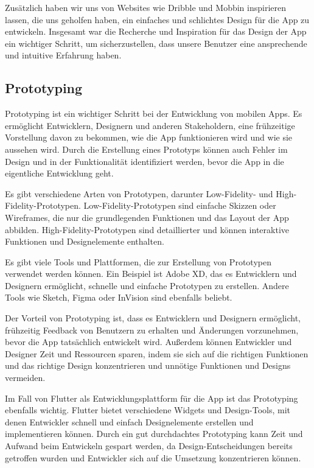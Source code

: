 Zusätzlich haben wir uns von Websites wie Dribble und Mobbin inspirieren lassen, die uns geholfen haben, ein einfaches und schlichtes Design für die App zu entwickeln. Insgesamt war die Recherche und Inspiration für das Design der App ein wichtiger Schritt, um sicherzustellen, dass unsere Benutzer eine ansprechende und intuitive Erfahrung haben.

\subsection{Prototyping}
Prototyping ist ein wichtiger Schritt bei der Entwicklung von mobilen Apps. Es ermöglicht Entwicklern, Designern und anderen Stakeholdern, eine frühzeitige Vorstellung davon zu bekommen, wie die App funktionieren wird und wie sie aussehen wird. Durch die Erstellung eines Prototyps können auch Fehler im Design und in der Funktionalität identifiziert werden, bevor die App in die eigentliche Entwicklung geht.

Es gibt verschiedene Arten von Prototypen, darunter Low-Fidelity- und High-Fidelity-Prototypen. Low-Fidelity-Prototypen sind einfache Skizzen oder Wireframes, die nur die grundlegenden Funktionen und das Layout der App abbilden. High-Fidelity-Prototypen sind detaillierter und können interaktive Funktionen und Designelemente enthalten.

Es gibt viele Tools und Plattformen, die zur Erstellung von Prototypen verwendet werden können. Ein Beispiel ist Adobe XD, das es Entwicklern und Designern ermöglicht, schnelle und einfache Prototypen zu erstellen. Andere Tools wie Sketch, Figma oder InVision sind ebenfalls beliebt.

Der Vorteil von Prototyping ist, dass es Entwicklern und Designern ermöglicht, frühzeitig Feedback von Benutzern zu erhalten und Änderungen vorzunehmen, bevor die App tatsächlich entwickelt wird. Außerdem können Entwickler und Designer Zeit und Ressourcen sparen, indem sie sich auf die richtigen Funktionen und das richtige Design konzentrieren und unnötige Funktionen und Designs vermeiden.

Im Fall von Flutter als Entwicklungsplattform für die App ist das Prototyping ebenfalls wichtig. Flutter bietet verschiedene Widgets und Design-Tools, mit denen Entwickler schnell und einfach Designelemente erstellen und implementieren können. Durch ein gut durchdachtes Prototyping kann Zeit und Aufwand beim Entwickeln gespart werden, da Design-Entscheidungen bereits getroffen wurden und Entwickler sich auf die Umsetzung konzentrieren können.

